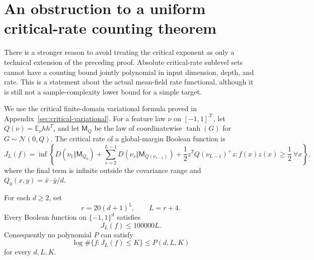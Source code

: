 \section{An obstruction to a uniform critical-rate counting theorem}
\label{sec:critical-rate-obstruction}

There is a stronger reason to avoid treating the critical exponent as
only a technical extension of the preceding proof. Absolute critical-rate
sublevel sets cannot have a counting bound jointly polynomial in input
dimension, depth, and rate. This is a statement about the actual
mean-field rate functional, although it is still not a sample-complexity
lower bound for a simple target.

We use the critical finite-domain variational formula proved in
Appendix~\ref{sec:critical-variational}.
For a feature law $\nu$ on $[-1,1]^{\mathcal X}$, let
$Q(\nu)=\mathbb E_\nu hh^T$, and let $\mathsf M_Q$ be the law of
coordinatewise $\tanh(G)$ for $G\sim\mathcal N(0,Q)$.
The critical rate of a global-margin Boolean function is
\[
 J_L(f)=\inf\left\{
 D(\nu_1\Vert\mathsf M_{Q_0})+
 \sum_{s=2}^{L-1}D(\nu_s\Vert\mathsf M_{Q(\nu_{s-1})})+
 \frac12z^TQ(\nu_{L-1})^+z:
 f(x)z(x)\ge\frac12\ \forall x\right\},
\]
where the final term is infinite outside the covariance range and
$Q_0(x,y)=\bar x\cdot\bar y/d$.

\begin{theorem}
\label{thm:critical-counting-obstruction}
For each $d\ge2$, set
\[
 r=20(d+1)^5,\qquad L=r+4.
\]
Every Boolean function on $\{-1,1\}^d$ satisfies
\[
 J_L(f)\le100000L.
\]
Consequently no polynomial $P$ can satisfy
\[
 \log\#\{f:J_L(f)\le K\}\le P(d,L,K)
\]
for every $d,L,K$.
\end{theorem}

